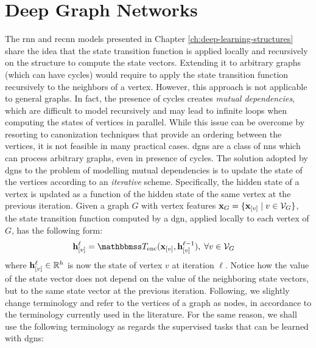 \chapter{Deep Graph Networks} \label{ch:dgn}

The \gls{rnn} and \gls{recnn} models presented in Chapter \ref{ch:deep-learning-structures} share the idea that the state transition function is applied locally and recursively on the structure to compute the state vectors. Extending it to arbitrary graphs (which can have cycles) would require to apply the state transition function recursively to the neighbors of a vertex. However, this approach is not applicable to general graphs. In fact, the presence of cycles creates \emph{mutual dependencies}, which are difficult to model recursively and may lead to infinite loops when computing the states of vertices in parallel. While this issue can be overcome by resorting to canonization techniques that provide an ordering between the vertices, it is not feasible in many practical cases. \glspl{dgn} are a class of \glspl{nn} which can process arbitrary graphs, even in presence of cycles. The solution adopted by \glspl{dgn} to the problem of modelling mutual dependencies is to update the state of the vertices according to an \emph{iterative} scheme. Specifically, the hidden state of a vertex is updated as a function of the hidden state of the same vertex at the previous iteration. Given a graph $G$ with vertex features $\Vector{X}_G = \Set{\Elem{x}{v} \mid v \in \Cal{V}_G}$, the state transition function computed by a \gls{dgn}, applied locally to each vertex of $G$, has the following form:
\begin{align*}
    \Elem{h}{v}^{\ell} &= \Transduction_{\Fun{enc}}(\Elem{x}{v}, \Elem{h}{v}^{\ell-1}), \; \forall v \in \Cal{v}_G
\end{align*}
where $\Elem{h}{v}^{\ell} \in \Real^h$ is now the state of vertex $v$ at iteration $\ell$. Notice how the value of the state vector does not depend on the value of the neighboring state vectors, but to the same state vector at the previous iteration. Following, we slightly change terminology and refer to the vertices of a graph as nodes, in accordance to the terminology currently used in the literature. For the same reason, we shall use the following terminology as regards the supervised tasks that can be learned with \glspl{dgn}:
